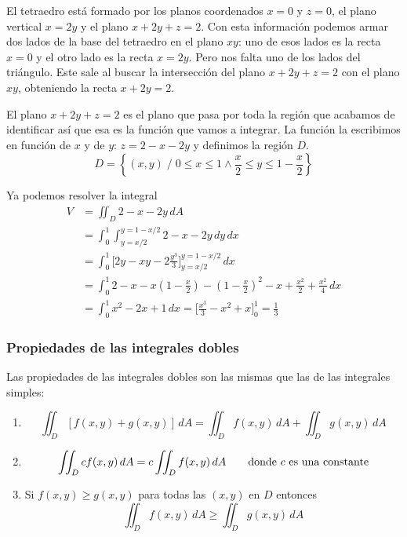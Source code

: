 \documentclass[12pt]{article}
\begin{document}
El tetraedro está formado por los planos coordenados $ x=0 $ y $ z=0 $, el plano vertical $ x=2y $ y el plano $ x+2y+z=2 $. Con esta información podemos armar dos lados de la base del tetraedro en el plano $ xy $: uno de esos lados es la recta $ x=0 $ y el otro lado es la recta $ x=2y $. Pero nos falta uno de los lados del triángulo. Este sale al buscar la intersección del plano $ x+2y+z=2 $ con el plano $ xy $, obteniendo la recta $ x+2y=2 $. 

El plano $ x+2y+z=2 $ es el plano que pasa por toda la región que acabamos de identificar así que esa es la función que vamos a integrar. La función la escribimos en función de $ x $ y de $ y $: $ z=2-x-2y $ y definimos la región $ D $.
\[
  D=\left\{(x,y) \;/\; 0\leq x\leq 1 \land \frac{x}{2}\leq y\leq 1-\frac{x}{2}\right\}
\]

Ya podemos resolver la integral
\begin{align*}
  V &= \iint_{D} 2-x-2y \,dA\\
   &= \int_{0}^{1} \int_{y=x/2}^{y=1-x/2} 2-x-2y \,dy\,dx\\
    &= \int_{0}^{1} \Bigg[2y-xy-2\frac{y^3}{3}\Bigg]_{y=x/2}^{y=1-x/2} \,dx\\
     &= \int_{0}^{1} 2-x-x\left(1-\frac{x}{2}\right)-\left(1-\frac{x}{2}\right)^2-x+\frac{x^2}{2}+\frac{x^2}{4} \,dx\\
      &= \int_{0}^{1} x^2-2x+1 \,dx = \Bigg[\frac{x^3}{3}-x^2+x\Bigg]_{0}^{1}=\frac{1}{3}
\end{align*}

\subsubsection{Propiedades de las integrales dobles}
Las propiedades de las integrales dobles son las mismas que las de las integrales simples:
\begin{enumerate}[1.]
  \item \[
	  \iint_{D} \left[f(x,y)+g(x,y)\right] \,dA = \iint_{D} f(x,y) \,dA + \iint_{D} g(x,y) \,dA
  \]

  \item \[
    \iint_{D} cf(x,y) \,dA = c\iint_{D} f(x,y) \,dA \qquad \text{donde $ c $ es una constante}
  \]

  \item Si $ f(x,y)\geq g(x,y) $ para todas las $ (x,y) $ en $ D $ entonces
	  \[
	    \iint_{D} f(x,y) \,dA \geq \iint_{D} g(x,y) \,dA
	  \]
\end{enumerate}
\end{document}
